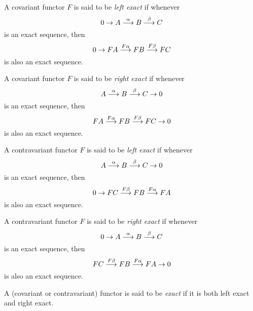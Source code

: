 \documentclass{article}
\begin{document}
A covariant functor $F$ is said to be {\it left exact} if whenever
$$0 \to A \buildrel \alpha \over \longrightarrow B \buildrel \beta \over \longrightarrow C$$
is an exact sequence, then 
$$0 \to FA \buildrel F\alpha \over \longrightarrow FB \buildrel F\beta \over \longrightarrow FC$$
is also an exact sequence.

A covariant functor $F$ is said to be {\it right exact} if whenever
$$A \buildrel \alpha \over \longrightarrow B \buildrel \beta \over \longrightarrow C \to 0$$
is an exact sequence, then
$$FA \buildrel F\alpha \over \longrightarrow FB \buildrel F\beta \over \longrightarrow FC \to 0$$
is also an exact sequence.

A contravariant functor $F$ is said to be {\it left exact} if whenever
$$A \buildrel \alpha \over \longrightarrow B \buildrel \beta \over \longrightarrow C \to 0$$
is an exact sequence, then
$$0 \to FC \buildrel F\beta \over \longrightarrow FB \buildrel F\alpha \over \longrightarrow FA$$
is also an exact sequence.

A contravariant functor $F$ is said to be {\it right exact} if whenever
$$0 \to A \buildrel \alpha \over \longrightarrow B \buildrel \beta \over \longrightarrow C$$
is an exact sequence, then
$$FC \buildrel F\beta \over \longrightarrow FB \buildrel F\alpha \over \longrightarrow FA \to 0$$
is also an exact sequence.

A (covariant or contravariant) functor is said to be {\it exact}
if it is both left exact and right exact.
\end{document}
